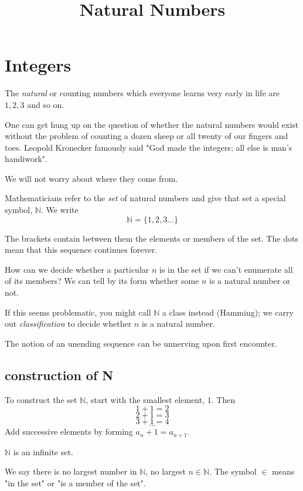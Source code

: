 \documentclass[11pt, oneside]{article}
\title{Natural Numbers}
\date{}
\begin{document}
\maketitle
\Large

\section*{Integers}

The \emph{natural} or counting numbers which everyone learns very early in life are $1, 2, 3$ and so on.

One can get hung up on the question of whether the natural numbers would exist without the problem of counting a dozen sheep or all twenty of our fingers and toes.  Leopold Kronecker famously said "God made the integers; all else is man's handiwork".

We will not worry about where they come from.

Mathematicians refer to the \emph{set} of natural numbers and give that set a special symbol, $\mathbb{N}$.  We write
\[ \mathbb{N} = \{ 1, 2, 3 \dots \} \]

The brackets contain between them the elements or members of the set. The dots mean that this sequence continues forever.

How can we decide whether a particular $n$ is in the set if we can't enumerate all of its members?  We can tell by its form whether some $n$ is a natural number or not.  

If this seems problematic, you might call $\mathbb{N}$ a class instead (Hamming);  we carry out \emph{classification} to decide whether $n$ is a natural number.

The notion of an unending sequence can be unnerving upon first encounter.

\subsection*{construction of N}

To construct the set $\mathbb{N}$, start with the smallest element, $1$.  Then 
\[ 1 + 1 = 2 \]
\[ 2 + 1 = 3 \]
\[ 3 + 1 = 4 \]
\[ \dots \]
Add successive elements by forming $a_n + 1 = a_{n+1}$.

$\mathbb{N}$ is an infinite set.

We say there is no largest number in $\mathbb{N}$, no largest $n \in \mathbb{N}$.  The symbol $\in$ means "in the set" or "is a member of the set".
\end{document}
